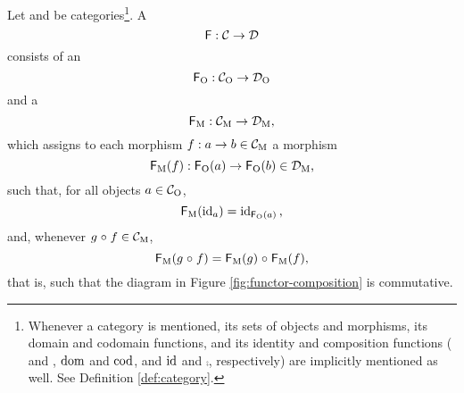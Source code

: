 

\begin{definition}
  [Functor]

  \label{def:functor}


  Let  and  be categories\footnote{Whenever a category
     is mentioned, its sets of objects and morphisms, its
    domain and codomain functions, and its identity and composition
    functions ( and , $\operatorname{dom}$ and $\operatorname{cod}$, and $\operatorname{id}$ and
    $\comp$, respectively) are implicitly mentioned as well. See
    Definition \ref{def:category}.}.
  A 
  \begin{equation*}
    \label{eq:functor}
    \mathsf{F}: \mathcal{C} \to \mathcal{D}
  \end{equation*}
  consists of an 
  \begin{equation}
    \label{eq:functor-object}
    \mathsf{F}_{\operatorname{O}}: \mathcal{C}_{\operatorname{O}} \to \mathcal{D}_{\operatorname{O}}
  \end{equation}
  and a 
  \begin{equation}
    \label{eq:functor-morphism}
    \mathsf{F}_{\operatorname{M}}: \mathcal{C}_{\operatorname{M}} \to \mathcal{D}_{\operatorname{M}}
    \text{,}
  \end{equation}
  which assigns to each morphism $f: a \to b \in \mathcal{C}_{\operatorname{M}}$ a morphism
  \begin{equation*}
    \mathsf{F}_{\operatorname{M}}(f): \mathsf{F}_{\operatorname{O}}(a) \to \mathsf{F}_{\operatorname{O}}(b) \in \mathcal{D}_{\operatorname{M}}
    \text{,}
  \end{equation*}
  such that, for all objects $a \in \mathcal{C}_{\operatorname{O}}$,
  \begin{equation}
    \label{eq:functor-identity}
    \mathsf{F}_{\operatorname{M}}(\operatorname{id}_{a}) = \operatorname{id}_{\mathsf{F}_{\operatorname{O}}(a)}
    \text{,}
  \end{equation}
  and, whenever $g \mathrel{\circ} f \in \mathcal{C}_{\operatorname{M}}$,
  \begin{equation}
    \label{eq:functor-composition}
    \mathsf{F}_{\operatorname{M}}(g \mathrel{\circ} f) = \mathsf{F}_{\operatorname{M}}(g) \mathrel{\circ} \mathsf{F}_{\operatorname{M}}(f)
    \text{,}
  \end{equation}
  that is, such that the diagram in Figure
  \ref{fig:functor-composition} is commutative.
  \begin{figure}[htbp]
    \begin{center}
\end{center}
\end{figure}
\end{definition}
